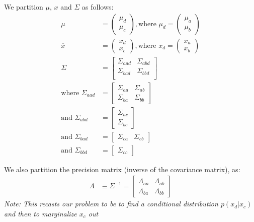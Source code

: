 We partition $\mu$, $x$ and $\Sigma$ as follows:
\begin{align*}
	\mu &= \begin{pmatrix}
		\mu_d \\
		\mu_c
	\end{pmatrix}, \text{where } \mu_d = \begin{pmatrix}\mu_a \\ \mu_b \end{pmatrix} \\
	\overline{x} &= \begin{pmatrix}
		x_d \\
		x_c
	\end{pmatrix}, \text{where } x_d = \begin{pmatrix}x_a \\ x_b \end{pmatrix} \\
	\Sigma &= \begin{bmatrix}
		\Sigma_{aad} & \Sigma_{abd} \\
		\Sigma_{bad} & \Sigma_{bbd} \\
	\end{bmatrix} \\
	\text{where } \Sigma_{aad} &= \begin{bmatrix}
		\Sigma_{aa} & \Sigma_{ab} \\
		\Sigma_{ba} & \Sigma_{bb}
	\end{bmatrix} \\
	\text{and } \Sigma_{abd} &= \begin{bmatrix}
		\Sigma_{ac} \\ \Sigma_{bc}
	\end{bmatrix} \\
	\text{and } \Sigma_{bad} &= \begin{bmatrix}
		\Sigma_{ca} & \Sigma_{cb}
	\end{bmatrix} \\
	\text{and } \Sigma_{bbd} &= \begin{bmatrix} \Sigma_{cc} \end{bmatrix}
\end{align*}

We also partition the precision matrix
(inverse of the covariance matrix), as:
\begin{align}
	\Lambda &\equiv \Sigma^{-1} = \begin{bmatrix}
		\Lambda_{aa} & \Lambda_{ab} \\
		\Lambda_{ba} & \Lambda_{bb}
	\end{bmatrix}
\end{align}
\textit{Note: This recasts our problem to be to find a conditional distribution
$p(x_d|x_c)$ and then to marginalize $x_c$ out}

